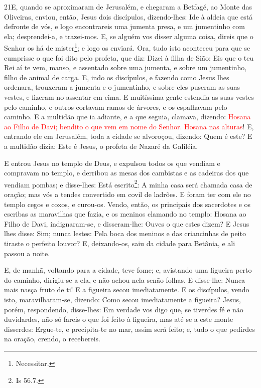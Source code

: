\lettrine{21} E, quando se aproximaram de Jerusalém, e
chegaram a Betfagé, ao Monte das Oliveiras, enviou, então, Jesus
dois discípulos, dizendo-lhes: Ide à aldeia que está defronte de
vós, e logo encontrareis uma jumenta presa, e um jumentinho com ela;
desprendei-a, e trazei-mos. E, se alguém vos disser alguma
coisa, direis que o Senhor os há de mister\footnote{Necessitar.}; e
logo os enviará. Ora, tudo isto aconteceu para que se cumprisse
o que foi dito pelo profeta, que diz: Dizei à filha de Sião: Eis
que o teu Rei aí te vem, manso, e assentado sobre uma jumenta, e
sobre um jumentinho, filho de animal de carga. E, indo os
discípulos, e fazendo como Jesus lhes ordenara, trouxeram a
jumenta e o jumentinho, e sobre eles puseram as suas vestes, e
fizeram-no assentar em cima. E muitíssima gente estendia as suas
vestes pelo caminho, e outros cortavam ramos de árvores, e os
espalhavam pelo caminho. E a multidão que ia adiante, e a que
seguia, clamava, dizendo: \textcolor{red}{Hosana ao Filho de Davi; bendito o
que vem em nome do Senhor. Hosana nas alturas}! E, entrando
ele em Jerusalém, toda a cidade se alvoroçou, dizendo: Quem é este?
E a multidão dizia: Este é Jesus, o profeta de Nazaré da
Galiléia.

E entrou Jesus no templo de Deus, e expulsou todos os que vendiam
e compravam no templo, e derribou as mesas dos cambistas e as
cadeiras dos que vendiam pombas; e disse-lhes: Está
escrito\footnote{Is 56.7.}: A minha casa será chamada casa de
oração; mas vós a tendes convertido em covil de ladrões. E
foram ter com ele no templo cegos e coxos, e curou-os. Vendo,
então, os principais dos sacerdotes e os escribas as maravilhas que
fazia, e os meninos clamando no templo: Hosana ao Filho de Davi,
indignaram-se, e disseram-lhe: Ouves o que estes dizem? E
Jesus lhes disse: Sim; nunca lestes: Pela boca dos meninos e das
criancinhas de peito tiraste o perfeito louvor? E,
deixando-os, saiu da cidade para Betânia, e ali passou a noite.

E, de manhã, voltando para a cidade, teve fome; e,
avistando uma figueira perto do caminho, dirigiu-se a ela, e não
achou nela senão folhas. E disse-lhe: Nunca mais nasça fruto de ti!
E a figueira secou imediatamente. E os discípulos, vendo
isto, maravilharam-se, dizendo: Como secou imediatamente a figueira?
Jesus, porém, respondendo, disse-lhes: Em verdade vos digo
que, se tiverdes fé e não duvidardes, não só fareis o que foi feito
à figueira, mas até se a este monte disserdes: Ergue-te, e
precipita-te no mar, assim será feito; e, tudo o que pedirdes
na oração, crendo, o recebereis.

